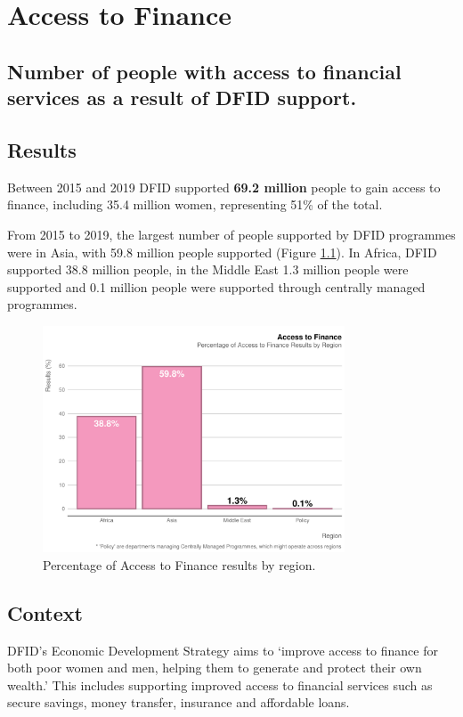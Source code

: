 \chapter{Access to Finance}

\section*{Number of people with access to financial services as a result of DFID support.}


\thispagestyle{empty}


\section{Results}

Between 2015 and 2019 DFID supported \textbf{69.2 million} people to gain access to finance, including 35.4 million women, representing 51\% of the total. %

From 2015 to 2019, the largest number of people supported by DFID programmes were in Asia, with 59.8
million people supported (Figure \ref{fig:a2f_region_plot}). In Africa, DFID supported 38.8 million people, in the Middle East 1.3 million people were supported and 0.1 million people were supported through centrally managed programmes.


\begin{figure}[htbp]
	\centering
	\includegraphics[width=0.8\textwidth]{../figs/a2f_region_plot} \hfill
	\caption{Percentage of Access to Finance results by region.}
	\label{fig:a2f_region_plot}
\end{figure}

\section{Context}
DFID’s Economic Development Strategy aims to `improve access to finance for both poor women and men,
helping them to generate and protect their own wealth.' %
This includes supporting improved access to financial services such as secure savings, money transfer, insurance and affordable loans. %

